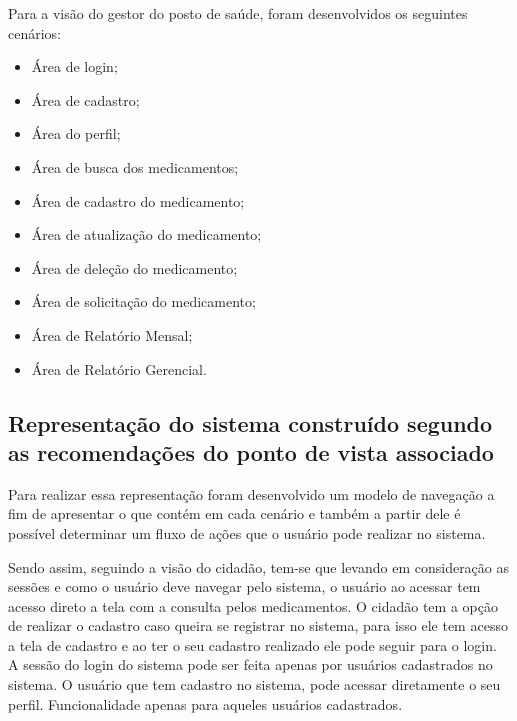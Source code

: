 Para a visão do gestor do posto de saúde, foram desenvolvidos os seguintes cenários:

\begin{itemize}
    \item Área de login;
    \item Área de cadastro;
    \item Área do perfil;
    \item Área de busca dos medicamentos;
    \item Área de cadastro do medicamento;
    \item Área de atualização do medicamento;
    \item Área de deleção do medicamento;
    \item Área de solicitação do medicamento;
    \item Área de Relatório Mensal;
    \item Área de Relatório Gerencial.
\end{itemize}

\subsection{Representação do sistema construído segundo as recomendações do ponto de vista associado}

Para realizar essa representação foram desenvolvido um modelo de navegação a fim de apresentar o que contém em cada cenário e também a partir dele é possível determinar um fluxo de ações que o usuário pode realizar no sistema. 

Sendo assim, seguindo a visão do cidadão, tem-se que levando em consideração as sessões e como o usuário deve navegar pelo sistema, o usuário ao acessar tem acesso direto a tela com a consulta pelos medicamentos.
O cidadão tem a opção de realizar o cadastro caso queira se registrar no sistema, para isso ele tem acesso a tela de cadastro e ao ter o seu cadastro realizado ele pode seguir para o login.
A sessão do login do sistema pode ser feita apenas por usuários cadastrados no sistema. 
O usuário que tem cadastro no sistema, pode acessar diretamente o seu perfil. Funcionalidade apenas para aqueles usuários cadastrados.

